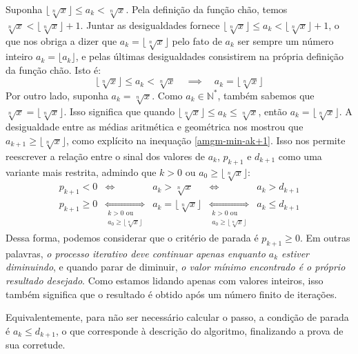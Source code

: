 Suponha $\lfloor \sqrt[n]{x} \rfloor \le a_k < \sqrt[n]{x}$.
Pela definição da função chão, temos
$\sqrt[n]{x} < \lfloor\sqrt[n]{x}\rfloor + 1$.
Juntar as desigualdades fornece
$\lfloor\sqrt[n]{x}\rfloor \le a_k < \lfloor\sqrt[n]{x}\rfloor + 1$,
o que nos obriga a dizer que $a_k = \lfloor\sqrt[n]{x}\rfloor$
pelo fato de $a_k$ ser sempre um número inteiro
$a_k = \lfloor a_k \rfloor$,
e pelas últimas desigualdades consistirem
na própria definição da função chão.
Isto é:
\begin{equation}\label{ak-between-floor-and-root}
  \lfloor \sqrt[n]{x} \rfloor \le a_k < \sqrt[n]{x}
  \quad\implies\quad
  a_k = \lfloor \sqrt[n]{x} \rfloor
\end{equation}
Por outro lado, suponha $a_k = \sqrt[n]{x}$.
Como $a_k \in \mathds{N}^*$,
também sabemos que $\sqrt[n]{x} = \lfloor \sqrt[n]{x} \rfloor$.
Isso significa que
quando $\lfloor \sqrt[n]{x} \rfloor \le a_k \le \sqrt[n]{x}$,
então $a_k = \lfloor \sqrt[n]{x} \rfloor$.
A desigualdade entre as médias aritmética e geométrica
nos mostrou que $a_{k+1} \ge \lfloor \sqrt[n]{x} \rfloor$,
como explícito na inequação \eqref{amgm-min-ak+1}.
Isso nos permite reescrever
a relação entre o sinal dos valores de $a_k$, $p_{k+1}$ e $d_{k+1}$
como uma variante mais restrita,
admindo que $k > 0$ ou $a_0 \ge \lfloor \sqrt[n]{x} \rfloor$:
\[
  \begin{array}{lcccr}
      p_{k+1} < 0
    &\iff&
      a_k > \sqrt[n]{x}
    &\iff&
      a_k > d_{k+1}
    \\
      p_{k+1} \ge 0
    &\underset{\substack{k > 0 \text{ ou} \\[.2em]
                         a_0 \ge \lfloor \sqrt[n]{x} \rfloor}}{\iff}&
      a_k = \lfloor \sqrt[n]{x} \rfloor
    &\underset{\substack{k > 0 \text{ ou} \\[.2em]
                         a_0 \ge \lfloor \sqrt[n]{x} \rfloor}}{\iff}&
      a_k \le d_{k+1}
  \end{array}
\]
Dessa forma,
podemos considerar que o critério de parada é $p_{k+1} \ge 0$.
Em outras palavras,
\emph{o processo iterativo deve continuar
      apenas enquanto $a_k$ estiver diminuindo},
e quando parar de diminuir,
\emph{o valor mínimo encontrado é o próprio resultado desejado}.
Como estamos lidando apenas com valores inteiros,
isso também significa que o resultado é obtido
após um número finito de iterações.

Equivalentemente, para não ser necessário calcular o passo,
a condição de parada é $a_k \le d_{k+1}$,
o que corresponde à descrição do algoritmo,
finalizando a prova de sua corretude.
